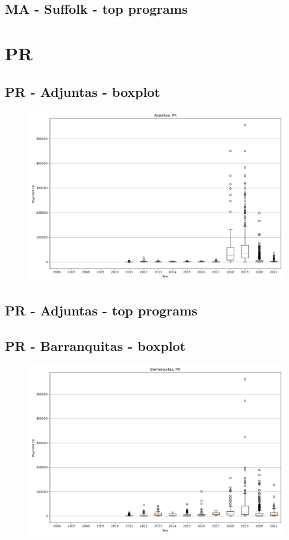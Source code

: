 \subsection*{MA - Suffolk - top programs}

\newpage
\section*{PR}
\subsection*{PR - Adjuntas - boxplot}
\begin{figure}[h]
\centering
\includegraphics[width=7in]{../output/boxplots/counties/Adjuntas-PR_boxplot.png}
\end{figure}


\subsection*{PR - Adjuntas - top programs}

\newpage
\subsection*{PR - Barranquitas - boxplot}
\begin{figure}[h]
\centering
\includegraphics[width=7in]{../output/boxplots/counties/Barranquitas-PR_boxplot.png}
\end{figure}


